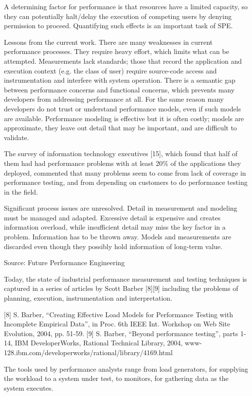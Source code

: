 \documentclass[runningheads,a4paper]{llncs}
\begin{document}
A determining factor for performance is that resources have a limited capacity,
so they can potentially halt/delay the execution of competing users by denying
permission to proceed. Quantifying such effects is an important task of SPE.

Lessons from the current work. There are many weaknesses in current performance
processes. They require heavy effort, which limits what can be attempted.
Measurements lack standards; those that record the application and execution context (e.g. the
class of user) require source-code access and instrumentation and interfere with
system operation.
There is a semantic gap between performance concerns and functional concerns,
which prevents many developers from addressing performance at all. For the
same reason many developers do not trust or understand performance models, even
if such models are available. Performance modeling is effective but it
is often costly; models are approximate, they leave out detail that may be
important, and are difficult to validate.

The survey of information technology executives [15], which found that half of
them had had performance problems with at least 20\% of the applications they
deployed, commented that many problems seem to come from lack of coverage in
performance testing, and from depending on customers to do performance testing in the field.

Significant process issues are unresolved. Detail in measurement and modeling
must be managed and adapted. Excessive detail is expensive and creates
information overload, while insufficient detail may miss the key factor in a
problem. Information has to be thrown away. Models and measurements are
discarded even though they possibly hold information of long-term value.

Source: Future Performance Engineering

Today, the state of industrial performance measurement and testing techniques is
captured in a series of articles by Scott Barber [8][9] including the problems
of planning, execution, instrumentation and interpretation.

[8] S. Barber, “Creating Effective Load Models for Performance Testing with
Incomplete Empirical Data”, in Proc. 6th IEEE Int. Workshop on Web Site Evolution, 2004,
pp. 51-59.
[9] S. Barber, “Beyond performance testing”, parts 1-14, IBM DeveloperWorks,
Rational Technical Library, 2004, www-128.ibm.com/developerworks/rational/library/4169.html

The tools used by performance analysts range from load generators, for supplying
the workload to a system under test, to monitors, for gathering data as the
system executes.
\end{document}
